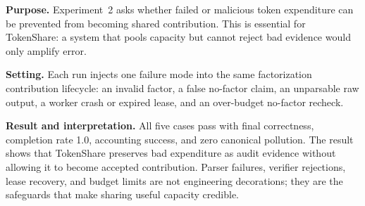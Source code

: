 \documentclass{article}
\theoremstyle{plain}
\begin{document}
{\color{blue}
\textbf{Purpose.} Experiment~2 asks whether failed or malicious token expenditure can be prevented from becoming shared contribution. This is essential for TokenShare: a system that pools capacity but cannot reject bad evidence would only amplify error.

\textbf{Setting.} Each run injects one failure mode into the same factorization contribution lifecycle: an invalid factor, a false no-factor claim, an unparsable raw output, a worker crash or expired lease, and an over-budget no-factor recheck.

\textbf{Result and interpretation.} All five cases pass with final correctness, completion rate 1.0, accounting success, and zero canonical pollution. The result shows that TokenShare preserves bad expenditure as audit evidence without allowing it to become accepted contribution. Parser failures, verifier rejections, lease recovery, and budget limits are not engineering decorations; they are the safeguards that make sharing useful capacity credible.
}
\end{document}
